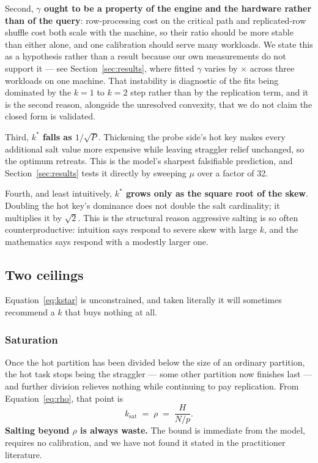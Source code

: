 Second, \textbf{$\gamma$ ought to be a property of the engine and the hardware
rather than of the query}: row-processing cost on the critical path and
replicated-row shuffle cost both scale with the machine, so their ratio should
be more stable than either alone, and one calibration should serve many
workloads. We state this as a hypothesis rather than a result because our own
measurements do not support it --- see Section~\ref{sec:results}, where fitted
$\gamma$ varies by \GammaSpread$\times$ across three workloads on one machine.
That instability is diagnostic of the fits being dominated by the $k=1$ to
$k=2$ step rather than by the replication term, and it is the second reason,
alongside the unresolved convexity, that we do not claim the closed form is
validated.

Third, \textbf{$k^{*}$ falls as $1/\sqrt{P}$}. Thickening the probe side's hot
key makes every additional salt value more expensive while leaving straggler
relief unchanged, so the optimum retreats. This is the model's sharpest
falsifiable prediction, and Section~\ref{sec:results} tests it directly by
sweeping $\mu$ over a factor of 32.

Fourth, and least intuitively, \textbf{$k^{*}$ grows only as the square root of
the skew}. Doubling the hot key's dominance does not double the salt
cardinality; it multiplies it by $\sqrt{2}$. This is the structural reason
aggressive salting is so often counterproductive: intuition says respond to
severe skew with large $k$, and the mathematics says respond with a modestly
larger one.

\subsection{Two ceilings}

Equation~\eqref{eq:kstar} is unconstrained, and taken literally it will
sometimes recommend a $k$ that buys nothing at all.

\subsubsection{Saturation}
Once the hot partition has been divided below the size of an ordinary
partition, the hot task stops being the straggler --- some other partition now
finishes last --- and further division relieves nothing while continuing to pay
replication. From Equation~\eqref{eq:rho}, that point is
\begin{equation}
k_{\text{sat}} \;=\; \rho \;=\; \frac{H}{N/p} .
\end{equation}
\textbf{Salting beyond $\rho$ is always waste.} The bound is immediate from the
model, requires no calibration, and we have not found it stated in the
practitioner literature.

